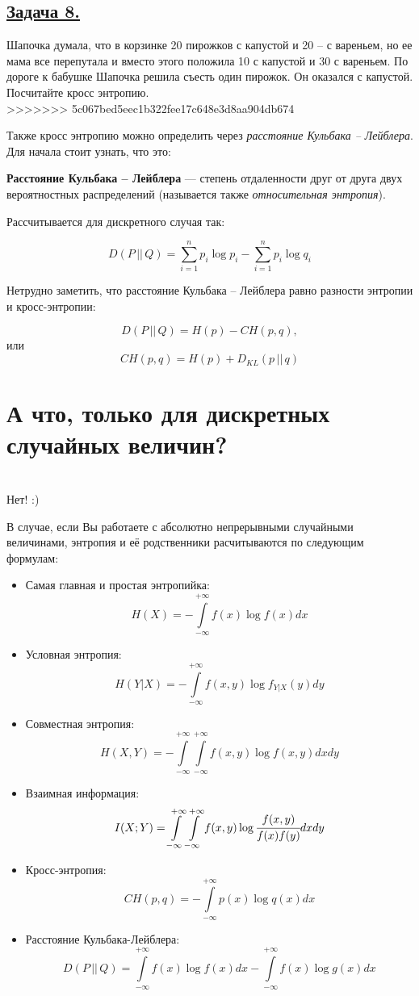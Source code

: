 \subsection*{\hyperref[sec:sol_problem8]{Задача 8.}}\label{sec:problem8} Шапочка думала, что в корзинке 20 пирожков с капустой и 20 – с вареньем, но ее мама все перепутала и вместо этого положила 10 с капустой и 30 с вареньем. По дороге к бабушке Шапочка решила съесть один пирожок. Он оказался с капустой. Посчитайте кросс энтропию.\\
>>>>>>> 5c067bed5eec1b322fee17c648e3d8aa904db674

Также кросс энтропию можно определить через \textit{расстояние Кульбака -- Лейблера}. Для начала стоит узнать, что это:

\begin{siderules}
    \textbf{Расстояние Кульбака -- Лейблера} --- степень отдаленности друг от друга двух вероятностных распределений (называется также \textit{относительная энтропия}). \end{siderules}
    
    Рассчитывается для дискретного случая так:

    \[D(P\, ||\, Q)=\sum\limits_{i=1}^n p_i\log p_i-\sum\limits_{i=1}^n p_i\log q_i\]

Нетрудно заметить, что расстояние Кульбака -- Лейблера равно разности энтропии и кросс-энтропии:

\[D(P\, ||\, Q)=H(p)-CH(p,q),\]
или
\[CH(p, q)=H(p)+D_{KL}(p\, || \, q)\]

\section*{А что, только для дискретных случайных величин?}~\
\\

Нет! :)

В случае, если Вы работаете с абсолютно непрерывными случайными величинами, энтропия и её родственники расчитываются по следующим формулам:

\begin{itemize}
    \item Самая главная и простая энтропийка:
    \[H(X)=-\int\limits_{-\infty}^{+\infty} f(x)\log f(x)dx \]
    \item Условная энтропия:
    \[H(Y|X)=-\int\limits_{-\infty}^{+\infty} f(x, y)\log f_{Y|X}(y)dy \]
    \item Совместная энтропия:
    \[H(X, Y)=-\int\limits_{-\infty}^{+\infty} \int\limits_{-\infty}^{+\infty} f(x, y)\log f(x, y)dxdy \]
    \item Взаимная информация:
    \[I(X; Y)=\int\limits_{-\infty}^{+\infty} \int\limits_{-\infty}^{+\infty} f(x, y) \log \cfrac{f(x, y)}{f(x)f(y)}dxdy \]
    \item Кросс-энтропия:
    \[CH(p, q)=-\int\limits_{-\infty}^{+\infty}p(x)\log q(x) dx \]
    \item Расстояние Кульбака-Лейблера:
    \[D(P\, ||\, Q)=\int\limits_{-\infty}^{+\infty} f(x)\log f(x)dx -\int\limits_{-\infty}^{+\infty} f(x)\log g(x)dx  \]
\end{itemize}

